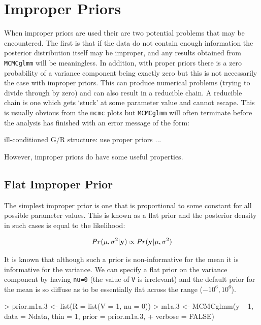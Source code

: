 \documentclass{article}
\begin{document}
\section{Improper Priors}
\label{IP-sec}

When improper priors are used their are two potential problems that may be encountered. The first is that if the data do not contain enough information the posterior distribution itself may be improper, and any results obtained from \texttt{MCMCglmm} will be meaningless. In addition, with proper priors there is a zero probability of a variance component being exactly zero but this is not necessarily the case with improper priors.  This can produce numerical problems (trying to divide through by zero) and can also result in a reducible chain. A reducible chain is one which gets `stuck' at some parameter value and cannot escape. This is usually obvious from the \texttt{mcmc} plots but \texttt{MCMCglmm} will often terminate before the analysis has finished with an error message of the form:

\begin{Schunk}
\begin{Soutput}
ill-conditioned G/R structure: use proper priors ...
\end{Soutput}
\end{Schunk}  

However, improper priors do have some useful properties.
 
\subsection{Flat Improper Prior}

The simplest improper prior is one that is proportional to some constant for all possible parameter values. This is known as a flat prior and the posterior density in such cases is equal to the likelihood:

\begin{displaymath}
Pr(\mu, \sigma^{2} | {\bf y}) \propto Pr({\bf y} | \mu, \sigma^{2})
\label{fprior-eq}
\end{displaymath}

It is known that although such a prior is non-informative for the mean it is informative for the variance. We can specify a flat prior on the variance component by having \texttt{nu=0} (the value of \texttt{V} is irrelevant) and the default prior for the mean is so diffuse as to be essentially flat across the range ($-10^6, 10^6$).   

\begin{Schunk}
\begin{Sinput}
> prior.m1a.3 <- list(R = list(V = 1, nu = 0))
> m1a.3 <- MCMCglmm(y ~ 1, data = Ndata, thin = 1, prior = prior.m1a.3, 
+     verbose = FALSE)
\end{Sinput}
\end{Schunk}
\end{document}
